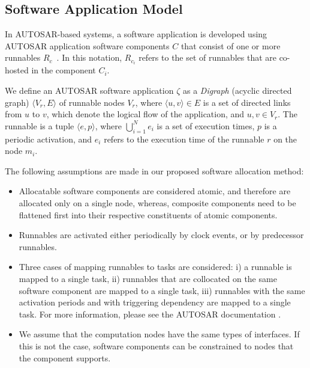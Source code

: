 \subsection{Software Application Model}
In AUTOSAR-based systems, a software application is developed using AUTOSAR application software components $C$ that consist of one or more runnables $R_c$~\cite{Schreiner2007ABus}. In this notation, $R_{c_i}$ refers to the set of runnables that are co-hosted in the component $C_i$.
\begin{definition} We define an AUTOSAR software application $\zeta$ as a \textit{Digraph} (acyclic directed graph) $\langle V_r, E\rangle$ of runnable nodes $V_r$, where $\langle u,v\rangle\in E$ is a set of directed links from $u$ to $v$, which denote the logical flow of the application, and $u,v\in V_r$. The runnable is a tuple $\langle e, p \rangle$, where $\bigcup_{i=1}^{N} e_{i}$ is a set of execution times, $p$ is a periodic activation, and $e_i$ refers to the execution time of the runnable $r$ on the node $m_i$.
\end{definition}
 
The following assumptions are made in our proposed software allocation method:
\begin{itemize}
\item Allocatable software components are considered atomic, and therefore are allocated only on a single node, whereas, composite components need to be flattened first into their respective constituents of atomic components.
\item Runnables are activated either periodically by clock events, or by predecessor runnables.
\item Three cases of mapping runnables to tasks are considered: i) a runnable is mapped to a single task, ii) runnables that are collocated on the same software component are mapped to a single task, iii) runnables with the same activation periods and with triggering dependency are mapped to a single task. For more information, please see the AUTOSAR documentation \cite{AUTOSAR2017SpecificationSoftware}.
\item We assume that the computation nodes have the same types of interfaces. If this is not the case, software components can be constrained to nodes that the component supports.
\end{itemize}

